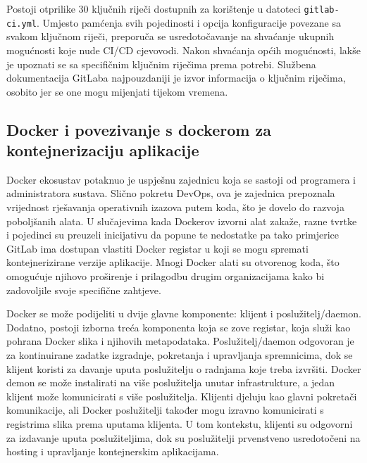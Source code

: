 \documentclass[a4paper,12pt,oneside]{article}
\begin{document}
Postoji otprilike 30 ključnih riječi dostupnih za korištenje u datoteci \texttt{gitlab-ci.yml}. Umjesto pamćenja svih pojedinosti i opcija konfiguracije povezane sa svakom ključnom riječi, preporuča se usredotočavanje na shvaćanje ukupnih mogućnosti koje nude CI/CD cjevovodi. Nakon shvaćanja općih mogućnosti, lakše je upoznati se sa specifičnim ključnim riječima prema potrebi. Službena dokumentacija GitLaba najpouzdaniji je izvor informacija o ključnim riječima, osobito jer se one mogu mijenjati tijekom vremena.

\subsection{Docker i povezivanje s dockerom za kontejnerizaciju aplikacije}

Docker ekosustav potaknuo je uspješnu zajednicu koja se sastoji od programera i administratora sustava. Slično pokretu DevOps, ova je zajednica prepoznala vrijednost rješavanja operativnih izazova putem koda, što je dovelo do razvoja poboljšanih alata. U slučajevima kada Dockerov izvorni alat zakaže, razne tvrtke i pojedinci su preuzeli inicijativu da popune te nedostatke pa tako primjerice GitLab ima dostupan vlastiti Docker registar u koji se mogu spremati kontejnerizirane verzije aplikacije. Mnogi Docker alati su otvorenog koda, što omogućuje njihovo proširenje i prilagodbu drugim organizacijama kako bi zadovoljile svoje specifične zahtjeve. 

Docker se može podijeliti u dvije glavne komponente: klijent i poslužitelj/daemon. Dodatno, postoji izborna treća komponenta koja se zove registar, koja služi kao pohrana Docker slika i njihovih metapodataka. Poslužitelj/daemon odgovoran je za kontinuirane zadatke izgradnje, pokretanja i upravljanja spremnicima, dok se klijent koristi za davanje uputa poslužitelju o radnjama koje treba izvršiti. Docker demon se može instalirati na više poslužitelja unutar infrastrukture, a jedan klijent može komunicirati s više poslužitelja. Klijenti djeluju kao glavni pokretači komunikacije, ali Docker poslužitelji također mogu izravno komunicirati s registrima slika prema uputama klijenta. U tom kontekstu, klijenti su odgovorni za izdavanje uputa poslužiteljima, dok su poslužitelji prvenstveno usredotočeni na hosting i upravljanje kontejnerskim aplikacijama.
\end{document}
